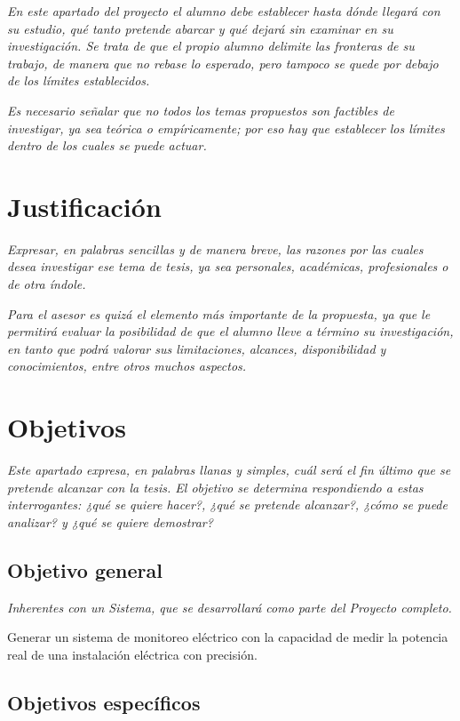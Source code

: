 \textit{En este apartado del proyecto el alumno debe establecer hasta dónde llegará con su estudio, qué tanto pretende abarcar y qué dejará sin examinar en su investigación. Se trata de que el propio alumno delimite las fronteras de su trabajo, de manera que no rebase lo esperado, pero tampoco se quede por debajo de los límites establecidos.}

\textit{Es necesario señalar que no todos los temas propuestos son factibles de investigar, ya sea teórica o empíricamente; por eso hay que establecer los límites dentro de los cuales se puede actuar.}

\section*{Justificación}

\textit{Expresar, en palabras sencillas y de manera breve, las razones por las cuales desea investigar ese tema de tesis, ya sea personales, académicas, profesionales o de otra índole. }

\textit{Para el asesor es quizá el elemento más importante de la propuesta, ya que le permitirá evaluar la posibilidad de que el alumno lleve a término su investigación, en tanto que podrá valorar sus limitaciones, alcances, disponibilidad y conocimientos, entre otros muchos aspectos.}

\newpage

\section*{Objetivos}

\textit{Este apartado expresa, en palabras llanas y simples, cuál será el fin último que se pretende alcanzar con la tesis. El objetivo se determina respondiendo a estas interrogantes: ¿qué se quiere hacer?, ¿qué se pretende alcanzar?, ¿cómo se puede analizar? y ¿qué se quiere demostrar?}

\subsection*{Objetivo general}

\textit{Inherentes con un Sistema, que se desarrollará como parte del Proyecto completo.}

Generar un sistema de monitoreo eléctrico con la capacidad de medir la potencia real de una instalación eléctrica con precisión.

\subsection*{Objetivos específicos}

